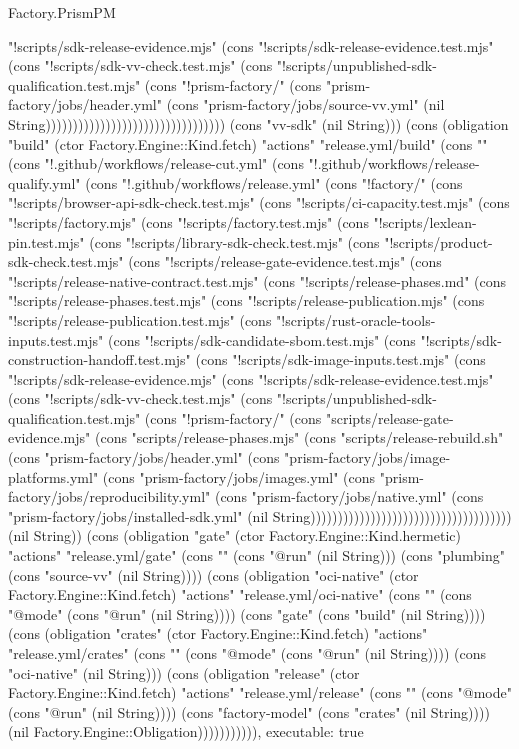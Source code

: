 \begin{lexlean}{Factory.PrismPM}
\begin{semanticmodule}
{"!scripts/sdk-release-evidence.mjs" (cons "!scripts/sdk-release-evidence.test.mjs" (cons "!scripts/sdk-vv-check.test.mjs" (cons "!scripts/unpublished-sdk-qualification.test.mjs" (cons "!prism-factory/" (cons "prism-factory/jobs/header.yml" (cons "prism-factory/jobs/source-vv.yml" (nil String))))))))))))))))))))))))))))))))) (cons "vv-sdk" (nil String))) (cons (obligation "build" (ctor Factory.Engine::Kind.fetch) "actions" "release.yml/build" (cons "" (cons "!.github/workflows/release-cut.yml" (cons "!.github/workflows/release-qualify.yml" (cons "!.github/workflows/release.yml" (cons "!factory/" (cons "!scripts/browser-api-sdk-check.test.mjs" (cons "!scripts/ci-capacity.test.mjs" (cons "!scripts/factory.mjs" (cons "!scripts/factory.test.mjs" (cons "!scripts/lexlean-pin.test.mjs" (cons "!scripts/library-sdk-check.test.mjs" (cons "!scripts/product-sdk-check.test.mjs" (cons "!scripts/release-gate-evidence.test.mjs" (cons "!scripts/release-native-contract.test.mjs" (cons "!scripts/release-phases.md" (cons "!scripts/release-phases.test.mjs" (cons "!scripts/release-publication.mjs" (cons "!scripts/release-publication.test.mjs" (cons "!scripts/rust-oracle-tools-inputs.test.mjs" (cons "!scripts/sdk-candidate-sbom.test.mjs" (cons "!scripts/sdk-construction-handoff.test.mjs" (cons "!scripts/sdk-image-inputs.test.mjs" (cons "!scripts/sdk-release-evidence.mjs" (cons "!scripts/sdk-release-evidence.test.mjs" (cons "!scripts/sdk-vv-check.test.mjs" (cons "!scripts/unpublished-sdk-qualification.test.mjs" (cons "!prism-factory/" (cons "scripts/release-gate-evidence.mjs" (cons "scripts/release-phases.mjs" (cons "scripts/release-rebuild.sh" (cons "prism-factory/jobs/header.yml" (cons "prism-factory/jobs/image-platforms.yml" (cons "prism-factory/jobs/images.yml" (cons "prism-factory/jobs/reproducibility.yml" (cons "prism-factory/jobs/native.yml" (cons "prism-factory/jobs/installed-sdk.yml" (nil String))))))))))))))))))))))))))))))))))))) (nil String)) (cons (obligation "gate" (ctor Factory.Engine::Kind.hermetic) "actions" "release.yml/gate" (cons "" (cons "@run" (nil String))) (cons "plumbing" (cons "source-vv" (nil String)))) (cons (obligation "oci-native" (ctor Factory.Engine::Kind.fetch) "actions" "release.yml/oci-native" (cons "" (cons "@mode" (cons "@run" (nil String)))) (cons "gate" (cons "build" (nil String)))) (cons (obligation "crates" (ctor Factory.Engine::Kind.fetch) "actions" "release.yml/crates" (cons "" (cons "@mode" (cons "@run" (nil String)))) (cons "oci-native" (nil String))) (cons (obligation "release" (ctor Factory.Engine::Kind.fetch) "actions" "release.yml/release" (cons "" (cons "@mode" (cons "@run" (nil String)))) (cons "factory-model" (cons "crates" (nil String)))) (nil Factory.Engine::Obligation))))))))))),
  executable: true
}


\end{semanticmodule}
\end{lexlean}
